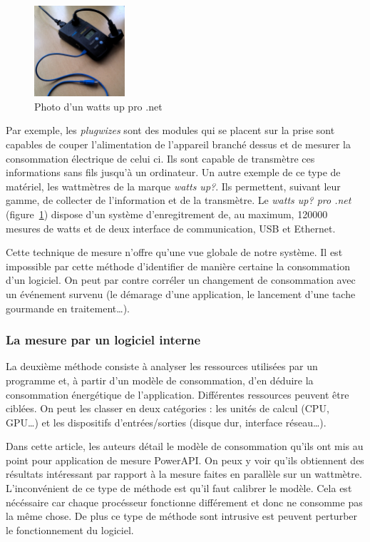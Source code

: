 \documentclass[a4paper, 11pt]{report}
\begin{document}
\begin{figure}
		\includegraphics[width=0.3\textwidth]{figures/wattsUp}
		\caption{Photo d'un watts up pro .net}
		\label{wattsUp}
\end{figure}

Par exemple, les \textit{plugwizes} sont des modules qui se placent sur la prise sont capables de couper l'alimentation de l'appareil branché dessus et de mesurer la consommation électrique de celui ci. Ils sont capable de transmètre ces informations sans fils jusqu'à un ordinateur. Un autre exemple de ce type de matériel, les wattmètres de la marque \textit{watts up\/?}. Ils permettent, suivant leur gamme, de collecter de l'information et de la transmètre. Le \textit{watts up\/? pro .net} (figure~\ref{wattsUp}) dispose d'un système d'enregitrement de, au maximum, 120000 mesures de watts et de deux interface de communication, USB et Ethernet.

Cette technique de mesure n'offre qu'une vue globale de notre système. Il est impossible par cette méthode d'identifier de manière certaine la consommation d'un logiciel. On peut par contre corréler un changement de consommation avec un événement survenu\cite{GreenMining} (le démarage d'une application, le lancement d'une tache gourmande en traitement\ldots). 

			\subsubsection{La mesure par un logiciel interne}
La deuxième méthode consiste à analyser les ressources utilisées par un programme et, à partir d'un modèle de consommation, d'en déduire la consommation énergétique de l'application. Différentes ressources peuvent être ciblées. On peut les classer en deux catégories : les unités de calcul (CPU, GPU\ldots) et les dispositifs d'entrées/sorties (disque dur, interface réseau\ldots).

Dans cette article\cite{noureddine:hal-00681560}, les auteurs détail le modèle de consommation qu'ils ont mis au point pour application de mesure PowerAPI. On peux y voir qu'ils obtiennent des résultats intéressant par rapport à la mesure faites en parallèle sur un wattmètre. L'inconvénient de ce type de méthode est qu'il faut calibrer le modèle. Cela est nécéssaire car chaque procésseur  fonctionne différement et donc ne consomme pas la même chose. De plus ce type de méthode sont intrusive est peuvent perturber le fonctionnement du logiciel.
\end{document}
